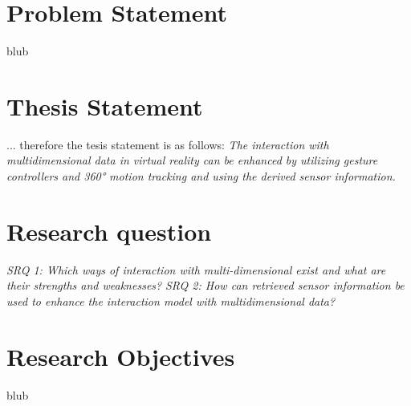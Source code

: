 \section{Problem Statement}

blub



\section{Thesis Statement}
... therefore the tesis statement is as follows: \newline
\textit{The interaction with multidimensional data in virtual reality can be enhanced by utilizing gesture controllers and 360° motion tracking and using the derived sensor information.}


\section{Research question}

\textit{SRQ 1: Which ways of interaction with multi-dimensional exist and what are their strengths and weaknesses?}
\newline
\textit{SRQ 2: How can retrieved sensor information be used to enhance the interaction model with multidimensional data?}




\section{Research Objectives}

blub





